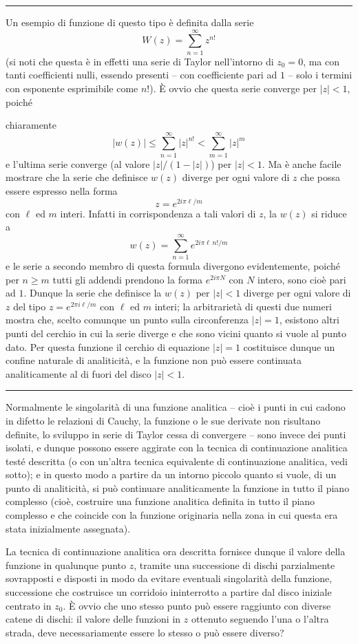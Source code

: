\documentclass[11pt, a4paper]{book}
\numberwithin{equation}{section}
\begin{document}
\medskip\hrule\medskip

Un esempio di funzione di questo tipo è definita dalla serie
\[
W(z) = \sum_{n=1}^{\infty} z^{n!}
\]
(si noti che questa è in effetti una serie di Taylor nell'intorno di $z_0 = 0$, ma con tanti coefficienti nulli, essendo presenti -- con coefficiente pari ad $1$ -- solo i termini con esponente esprimibile come $n!$). È ovvio che questa serie converge per $|z| < 1$, poiché

chiaramente
\[
|w(z)| \leq \sum_{n=1}^{\infty} |z|^{n!} < \sum_{m=1}^{\infty} |z|^m
\]
e l'ultima serie converge (al valore $|z|/(1-|z|)$) per $|z|<1$. Ma è anche facile mostrare che la serie che definisce $w(z)$ diverge per ogni valore di $z$ che possa essere espresso nella forma
\[
z = e^{2i\pi\ell/m}
\]
con $\ell$ ed $m$ interi. Infatti in corrispondenza a tali valori di $z$, la $w(z)$ si riduce a
\[
w(z) = \sum_{n=1}^{\infty} e^{2i\pi\ell\, n!/m}
\]
e le serie a secondo membro di questa formula divergono evidentemente, poiché per $n \geq m$ tutti gli addendi prendono la forma $e^{2i\pi N}$ con $N$ intero, sono cioè pari ad $1$. Dunque la serie che definisce la $w(z)$ per $|z|<1$ diverge per ogni valore di $z$ del tipo $z = e^{2\pi i\ell/m}$ con $\ell$ ed $m$ interi; la arbitrarietà di questi due numeri mostra che, scelto comunque un punto sulla circonferenza $|z|=1$, esistono altri punti del cerchio in cui la serie diverge e che sono vicini quanto si vuole al punto dato. Per questa funzione il cerchio di equazione $|z|=1$ costituisce dunque un confine naturale di analiticità, e la funzione non può essere continuata analiticamente al di fuori del disco $|z|<1$.

\medskip\hrule\medskip

Normalmente le singolarità di una funzione analitica -- cioè i punti in cui cadono in difetto le relazioni di Cauchy, la funzione o le sue derivate non risultano definite, lo sviluppo in serie di Taylor cessa di convergere -- sono invece dei punti isolati, e dunque possono essere aggirate con la tecnica di continuazione analitica testé descritta (o con un'altra tecnica equivalente di continuazione analitica, vedi sotto); e in questo modo a partire da un intorno piccolo quanto si vuole, di un punto di analiticità, si può continuare analiticamente la funzione in tutto il piano complesso (cioè, costruire una funzione analitica definita in tutto il piano complesso e che coincide con la funzione originaria nella zona in cui questa era stata inizialmente assegnata).

La tecnica di continuazione analitica ora descritta fornisce dunque il valore della funzione in qualunque punto $z$, tramite una successione di dischi parzialmente sovrapposti e disposti in modo da evitare eventuali singolarità della funzione, successione che costruisce un corridoio ininterrotto a partire dal disco iniziale centrato in $z_0$. È ovvio che uno stesso punto può essere raggiunto con diverse catene di dischi: il valore delle funzioni in $z$ ottenuto seguendo l'una o l'altra strada, deve necessariamente essere lo stesso o può essere diverso?
\end{document}
